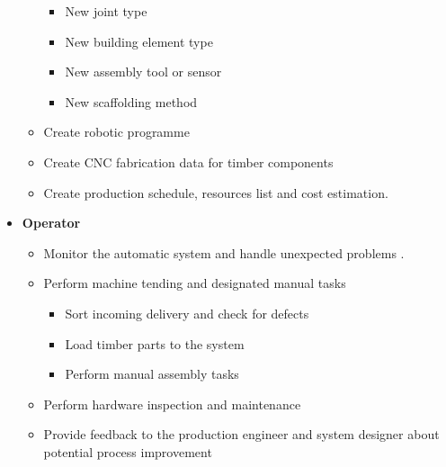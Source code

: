 \begin{itemize}
\begin{itemize}
		\begin{itemize}
			\item New joint type 

			\item New building element type

			\item New assembly tool or sensor

			\item New scaffolding method

		\end{itemize}
		\item Create robotic programme 
		\item Create CNC fabrication data for timber components 
		\item Create production schedule, resources list and cost estimation.
	\end{itemize}

	\item \textbf{Operator}

	\begin{itemize}
		\item Monitor the automatic system and handle unexpected problems .

		\item Perform machine tending and designated manual tasks 

		\begin{itemize}
			\item Sort incoming delivery and check for defects 
			\item Load timber parts to the system
			\item Perform manual assembly tasks 
		\end{itemize}

		\item Perform hardware inspection and maintenance

		\item Provide feedback to the production engineer and system designer about potential process improvement

	\end{itemize}
\end{itemize}

